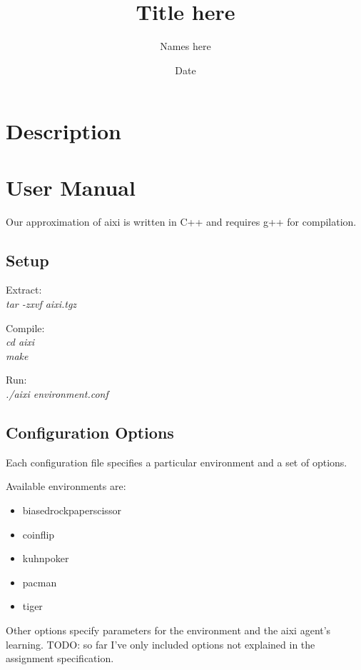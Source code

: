 \documentclass{article}
\title{Title here}
\author{Names here}
\date{Date}
\begin{document}
\maketitle

\section{Description}

\section{User Manual}

Our approximation of aixi is written in C++ and requires g++ for compilation.

\subsection{Setup}

\noindent Extract:\\
\indent \textit{tar -zxvf aixi.tgz}

\bigskip

\noindent Compile:\\
\indent \textit{cd aixi}\\
\indent \textit{make}

\bigskip

\noindent Run:\\
\indent \textit{./aixi environment.conf}

\subsection{Configuration Options}

Each configuration file specifies a particular environment and a set of options.

Available environments are:
\begin{itemize}
    \item biased\textunderscore rock\textunderscore paper\textunderscore scissor
    \item coinflip
    \item kuhn\textunderscore poker
    \item pacman
    \item tiger
\end{itemize}

Other options specify parameters for the environment and the aixi agent's learning.
TODO: so far I've only included options not explained in the assignment specification.
\end{document}
